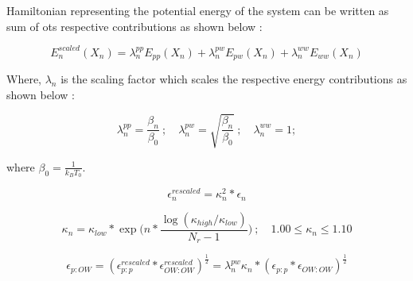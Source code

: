 \documentclass{memoir}
\begin{document}
Hamiltonian representing the potential energy of the system can be written as sum of ots respective contributions as shown below :

\begin{center}
    \begin{equation}
        E_{n}^{scaled}(X_{n}) = \lambda_{n}^{pp} E_{pp}(X_{n}) + \lambda_{n}^{pw} E_{pw}(X_{n}) + \lambda_{n}^{ww} E_{ww} (X_{n})
    \end{equation}
\end{center}


Where, $\lambda_{n}$ is the scaling factor which scales the respective energy contributions as shown below :  

\begin{center}
    \begin{equation}
        \lambda_{n}^{pp}=\frac{\beta_{n}}{\beta_{0}} \ ; \quad \lambda_{n}^{pw}=\sqrt{\frac{\beta_{n}}{\beta_{0}}} \ ; \quad \lambda_{n}^{ww}=1;        
    \end{equation}
\end{center}

where $\beta_{0}=\frac{1}{k_{B}T_{0}}$.

\begin{center}
    \begin{equation}
        \epsilon_{n}^{rescaled} = \kappa_{n}^{2} * \epsilon_{n}
    \end{equation}
\end{center}

\begin{center}
    \begin{equation}
        \kappa_{n}=\kappa_{low}*\exp{ \biggl(n*\frac{\log(\kappa_{high}/\kappa_{low})}{N_{r}-1}\biggr)} \ ; \quad 1.00 \leq \kappa_{n} \leq 1.10
    \end{equation}
\end{center}

\begin{center}
    \begin{equation}
        \epsilon_{p:OW}=(\epsilon_{p:p}^{rescaled} * \epsilon_{OW:OW}^{rescaled})^{\frac{1}{2}}=\lambda_{n}^{pw}\kappa_{n}*(\epsilon_{p:p} * \epsilon_{OW:OW})^{\frac{1}{2}}
    \end{equation}
\end{center}
\end{document}
